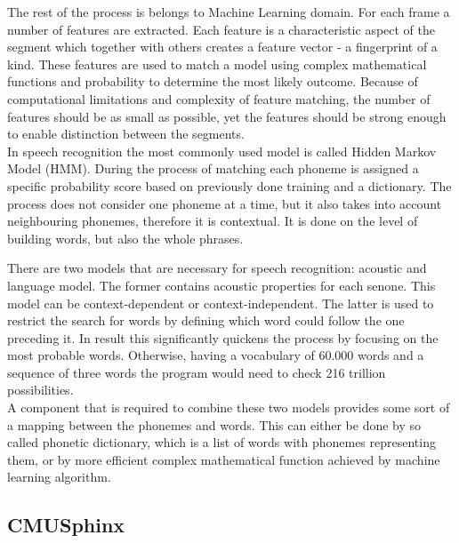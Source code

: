 The rest of the process is belongs to Machine Learning domain. For each frame a number of features are extracted. Each feature is a characteristic aspect of the segment which together with others creates a feature vector - a fingerprint of a kind. These features are used to match a model using complex mathematical functions and probability to determine the most likely outcome. Because of computational limitations and complexity of feature matching, the number of features should be as small as possible, yet the features should be strong enough to enable distinction between the segments. \\
In speech recognition the most commonly used model is called Hidden Markov Model (HMM). During the process of matching each phoneme is assigned a specific probability score based on previously done training and a dictionary. The process does not consider one phoneme at a time, but it also takes into account neighbouring phonemes, therefore it is contextual. It is done on the level of building words, but also the whole phrases.

There are two models that are necessary for speech recognition: acoustic and language model. The former contains acoustic properties for each senone. This model can be context-dependent or context-independent. The latter is used to restrict the search for words by defining which word could follow the one preceding it. In result this significantly quickens the process by focusing on the most probable words. Otherwise, having a vocabulary of 60.000 words and a sequence of three words the program would need to check 216 trillion possibilities. \\ A component that is required to combine these two models provides some sort of a mapping between the phonemes and words. This can either be done by so called phonetic dictionary, which is a list of words with phonemes representing them, or by more efficient complex mathematical function achieved by machine learning algorithm.

\subsection{CMUSphinx}

